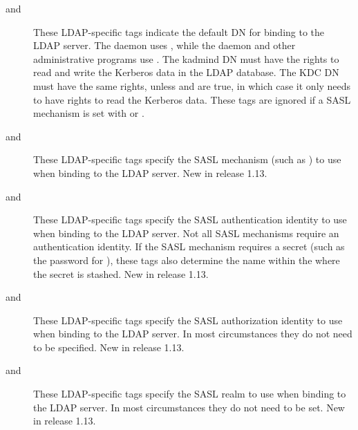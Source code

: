\documentclass[letterpaper,10pt,english]{sphinxmanual}
\begin{document}
\begin{description}
\item[{ and }] \leavevmode
These LDAP-specific tags indicate the default DN for binding to
the LDAP server.  The {\hyperref[\detokenize{admin/admin_commands/krb5kdc:krb5kdc-8}]{}} daemon uses
, while the {\hyperref[\detokenize{admin/admin_commands/kadmind:kadmind-8}]{}} daemon and other
administrative programs use .  The kadmind DN
must have the rights to read and write the Kerberos data in the
LDAP database.  The KDC DN must have the same rights, unless
 and  are true, in
which case it only needs to have rights to read the Kerberos data.
These tags are ignored if a SASL mechanism is set with
 or .

\item[{ and }] \leavevmode
These LDAP-specific tags specify the SASL mechanism (such as
) to use when binding to the LDAP server.  New in
release 1.13.

\item[{ and }] \leavevmode
These LDAP-specific tags specify the SASL authentication identity
to use when binding to the LDAP server.  Not all SASL mechanisms
require an authentication identity.  If the SASL mechanism
requires a secret (such as the password for ), these
tags also determine the name within the
 where the secret is stashed.  New
in release 1.13.

\item[{ and }] \leavevmode
These LDAP-specific tags specify the SASL authorization identity
to use when binding to the LDAP server.  In most circumstances
they do not need to be specified.  New in release 1.13.

\item[{ and }] \leavevmode
These LDAP-specific tags specify the SASL realm to use when
binding to the LDAP server.  In most circumstances they do not
need to be set.  New in release 1.13.


\end{description}
\end{document}
